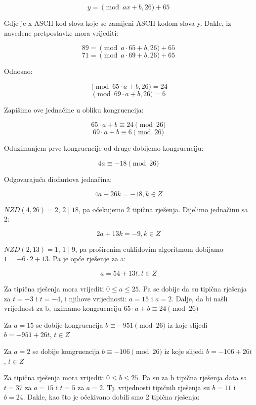 \documentclass[12pt]{article}
\begin{document}
$$y = \pmod{ax + b, 26} + 65$$\vspace{1mm}

Gdje je x ASCII kod slova koje se zamijeni ASCII kodom slova y. Dakle, iz navedene pretpostavke mora vrijediti:

$$89 = \pmod{a\cdot65 + b, 26} + 65$$ 
$$71 = \pmod{a\cdot69 + b, 26} + 65$$

Odnosno:

$$\pmod{65\cdot a + b, 26} = 24$$
$$\pmod{69\cdot a + b, 26} = 6$$\vspace{1mm}

Zapišimo ove jednačine u obliku kongruencija:

$$65\cdot a + b \equiv 24 \pmod{26}$$
$$69\cdot a + b \equiv 6 \pmod{26}$$\vspace{1mm}

Oduzimanjem prve kongruencije od druge dobijemo kongruenciju:

$$4a \equiv -18\pmod{26}$$\vspace{1mm}

Odgovarajuća diofantova jednačina:

$$4a + 26k = -18, k \in Z$$\vspace{1mm} 

$NZD(4, 26) = 2$, $2 \mid 18$, pa očekujemo 2 tipična rješenja. Dijelimo jednačinu sa 2:

$$2a + 13k = -9, k \in Z$$\vspace{1mm}

$NZD(2, 13) = 1$, $1 \mid 9$, pa proširenim euklidovim algoritmom dobijamo $1 = -6\cdot 2 + 13$. Pa je opće rješenje za a:

$$a = 54 + 13t, t \in Z$$\vspace{1mm}

Za tipična rješenja mora vrijediti $0 \leq a \leq 25$. Pa se dobije da su tipična rješenja za $t = -3$ i $t = -4$, i njihove vrijednosti: $a = 15$ i $a = 2$.
Dalje, da bi našli vrijednost za b, uzimamo kongruenciju $65\cdot a + b \equiv 24 \pmod{26}$\vspace{1mm}

Za $a = 15$ se dobije kongruencija $b \equiv -951 \pmod{26}$ iz koje slijedi $b = -951 + 26t$, $t \in Z$

Za $a = 2$ se dobije kongruencija $b \equiv -106 \pmod{26}$ iz koje slijedi $b = -106 + 26t$, $t \in Z$\vspace{1mm}

Za tipična rješenja mora vrijediti $0 \leq b \leq 25$. Pa su za b tipična rješenja data sa $t = 37$ za $a = 15$ i $t = 5$ za $a = 2$.  Tj. vrijednosti tipičnih rješenja su $b = 11$ i $b = 24$. Dakle, kao što je očekivano dobili smo 2 tipična rješenja: 
\end{document}
